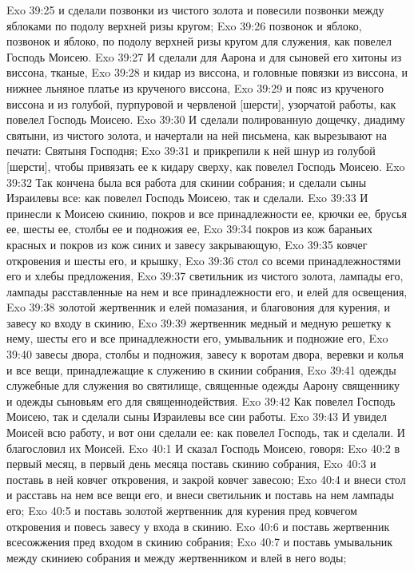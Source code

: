 Exo 39:25  и сделали позвонки из чистого золота и повесили позвонки между яблоками по подолу верхней ризы кругом;
Exo 39:26  позвонок и яблоко, позвонок и яблоко, по подолу верхней ризы кругом для служения, как повелел Господь Моисею.
Exo 39:27  И сделали для Аарона и для сыновей его хитоны из виссона, тканые,
Exo 39:28  и кидар из виссона, и головные повязки из виссона, и нижнее льняное платье из крученого виссона,
Exo 39:29  и пояс из крученого виссона и из голубой, пурпуровой и червленой [шерсти], узорчатой работы, как повелел Господь Моисею.
Exo 39:30  И сделали полированную дощечку, диадиму святыни, из чистого золота, и начертали на ней письмена, как вырезывают на печати: Святыня Господня;
Exo 39:31  и прикрепили к ней шнур из голубой [шерсти], чтобы привязать ее к кидару сверху, как повелел Господь Моисею.
Exo 39:32  Так кончена была вся работа для скинии собрания; и сделали сыны Израилевы все: как повелел Господь Моисею, так и сделали.
Exo 39:33  И принесли к Моисею скинию, покров и все принадлежности ее, крючки ее, брусья ее, шесты ее, столбы ее и подножия ее,
Exo 39:34  покров из кож бараньих красных и покров из кож синих и завесу закрывающую,
Exo 39:35  ковчег откровения и шесты его, и крышку,
Exo 39:36  стол со всеми принадлежностями его и хлебы предложения,
Exo 39:37  светильник из чистого золота, лампады его, лампады расставленные на нем и все принадлежности его, и елей для освещения,
Exo 39:38  золотой жертвенник и елей помазания, и благовония для курения, и завесу ко входу в скинию,
Exo 39:39  жертвенник медный и медную решетку к нему, шесты его и все принадлежности его, умывальник и подножие его,
Exo 39:40  завесы двора, столбы и подножия, завесу к воротам двора, веревки и колья и все вещи, принадлежащие к служению в скинии собрания,
Exo 39:41  одежды служебные для служения во святилище, священные одежды Аарону священнику и одежды сыновьям его для священнодействия.
Exo 39:42  Как повелел Господь Моисею, так и сделали сыны Израилевы все сии работы.
Exo 39:43  И увидел Моисей всю работу, и вот они сделали ее: как повелел Господь, так и сделали. И благословил их Моисей.
Exo 40:1  И сказал Господь Моисею, говоря:
Exo 40:2  в первый месяц, в первый день месяца поставь скинию собрания,
Exo 40:3  и поставь в ней ковчег откровения, и закрой ковчег завесою;
Exo 40:4  и внеси стол и расставь на нем все вещи его, и внеси светильник и поставь на нем лампады его;
Exo 40:5  и поставь золотой жертвенник для курения пред ковчегом откровения и повесь завесу у входа в скинию.
Exo 40:6  и поставь жертвенник всесожжения пред входом в скинию собрания;
Exo 40:7  и поставь умывальник между скиниею собрания и между жертвенником и влей в него воды;
